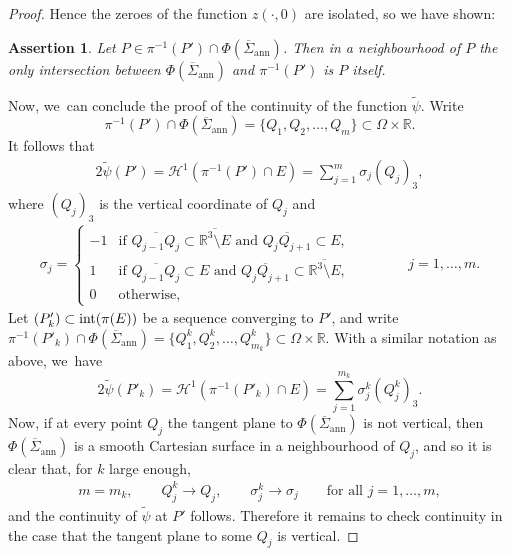 \documentclass[JEP,XML,SOM,Unicode, NoFloatCountersInSection,published]{cedram}
\newcommand{\R}{\mathbb{R}}
\let\pointinspace P
\newcommand{\immclosedann}{\Phi({\overline\Sigma}_\mathrm{ann})}
\newcommand{\pointinOm}{P'}
\newtheorem{assertion}{Assertion}
\theoremstyle{definition}
\begin{document}
\begin{proof}
Hence the zeroes of the function $z(\cdot,0)$ are isolated, so we have
shown:

\begin{assertion}\label{assertionA}
Let $\pointinspace\in \pi^{-1}(\pointinOm)\cap
\immclosedann$. Then in a neighbourhood of $\pointinspace$
the only intersection between $\immclosedann$
and $\pi^{-1}(\pointinOm)$ is $\pointinspace$ itself.
\end{assertion}

Now, we~can conclude the proof of
the continuity of the function $\widetilde\psi$.
Write
\[
\pi^{-1}(\pointinOm)\cap
\immclosedann=\{Q_1,Q_2,\dots,Q_{m}\}\subset\Omega\times\R.
\]
It follows that
\begin{align}\label{verticalslice}
2\widetilde\psi(\pointinOm)=\mathcal H^1(\pi^{-1}(\pointinOm)\cap E)=\sum_{j=1}^m\sigma_j (Q_j)_3,
\end{align}
where $(Q_j)_3$ is the vertical coordinate of $Q_j$ and
\begin{align}
\sigma_j=\begin{cases}
-1&\text{if }\overline{Q_{j-1}Q_j}\subset\overline{ \R^3\setminus E}\text{ and }\overline{Q_{j}Q_{j+1}}\subset E,\\
1 &\text{if }\overline{Q_{j-1}Q_j}\subset E\text{ and }\overline{Q_{j}Q_{j+1}}\subset \overline{\R^3\setminus E},\\
0&\text{otherwise,}
\end{cases}
\qquad \qquad j=1,\dots,m.
\end{align}
Let $(\pointinOm_k)
\subset \textup{int}(\pi(E))$ be a sequence converging to $\pointinOm$, and write $\pi^{-1}
(\pointinOm_k )\cap \immclosedann=\{Q^k_1,Q^k_2,\dots,Q^k_{m_k}\}\subset\Omega\times\R$. With a similar
notation as above, we~have
\begin{equation}\label{verticalslice2}
2\widetilde\psi(\pointinOm_k)=\mathcal H^1(\pi^{-1}(\pointinOm_k)
\cap E)=\sum_{j=1}^{m_k}\sigma^k_j (Q^k_j)_3.
\end{equation}
Now, if at
every point $Q_j$ the tangent plane to $\immclosedann$
is not vertical, then $\immclosedann$ is a smooth Cartesian surface in a neighbourhood of
$Q_j$, and so it is clear that, for $k$ large enough,
\begin{align}\label{6.18}
m=m_k,\qquad
Q_j^k\to Q_j,\qquad \sigma^k_j\to\sigma_j\qquad\text{for all }j=1,\dots,m,
\end{align}
and the continuity of $\widetilde \psi$ at $P'$ follows.
Therefore it remains to check continuity in the case that the tangent plane to some $Q_j$ is vertical.


\end{proof}
\end{document}

